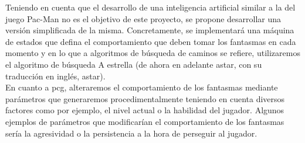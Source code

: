     Teniendo en cuenta que el desarrollo de una inteligencia artificial similar a la del juego Pac-Man no es el objetivo de este proyecto, se propone desarrollar una versión simplificada de la misma. Concretamente, se implementará una máquina de estados que defina el comportamiento que deben tomar los fantasmas en cada momento y en lo que a algoritmos de búsqueda de caminos se refiere, utilizaremos el algoritmo de búsqueda A estrella (de ahora en adelante \acrshort{astar}, con su traducción en inglés, \acrlong{astar}).\\
    
    En cuanto a \acrshort{pcg}, alteraremos el comportamiento de los fantasmas mediante parámetros que generaremos procedimentalmente teniendo en cuenta diversos factores como por ejemplo, el nivel actual o la habilidad del jugador. Algunos ejemplos de parámetros que modificarían el comportamiento de los fantasmas sería la agresividad o la persistencia a la hora de perseguir al jugador.